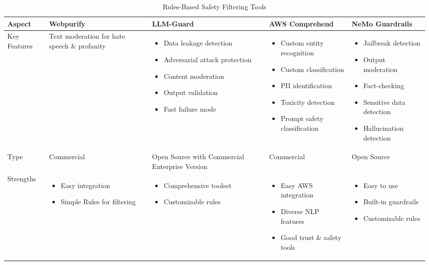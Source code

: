 \begin{table*}[h!]
\caption{Rules-Based Safety Filtering Tools}
\label{safety_layer_tools}
\begin{tabular}{|p{}|p{}|p{}|p{}|p{}|}
\hline
\textbf{Aspect} & \textbf{Webpurify} & \textbf{LLM-Guard} & \textbf{AWS Comprehend} & \textbf{NeMo Guardrails} \\
\hline
Key Features & Text moderation for hate speech \& profanity & \begin{itemize}\item Data leakage detection \item Adversarial attack protection \item Content moderation \item Output validation \item Fast failure mode\end{itemize} & \begin{itemize}\item Custom entity recognition \item Custom classification \item PII identification \item Toxicity detection \item Prompt safety classification\end{itemize} & \begin{itemize}\item Jailbreak detection \item Output moderation \item Fact-checking \item Sensitive data detection \item Hallucination detection\end{itemize} \\
\hline
Type & Commercial & Open Source with Commercial Enterprise Version & Commercial & Open Source \\
\hline
Strengths & \begin{itemize}\item Easy integration \item Simple Rules for filtering\end{itemize} & \begin{itemize}\item Comprehensive toolset \item Customizable rules\end{itemize} & \begin{itemize}\item Easy AWS integration \item Diverse NLP features \item Good trust \& safety tools\end{itemize} & \begin{itemize}\item Easy to use \item Built-in guardrails \item Customizable rules\end{itemize} \\

\end{tabular}
\end{table*}
